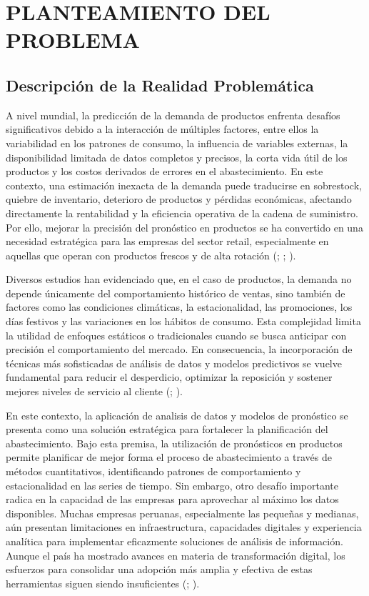 \chapter{PLANTEAMIENTO DEL PROBLEMA}
\section{Descripción de la Realidad Problemática}


A nivel mundial, la predicción de la demanda de productos enfrenta desafíos significativos debido a la interacción de múltiples factores, entre ellos la variabilidad en los patrones de consumo, la influencia de variables externas, la disponibilidad limitada de datos completos y precisos, la corta vida útil de los productos y los costos derivados de errores en el abastecimiento. En este contexto, una estimación inexacta de la demanda puede traducirse en sobrestock, quiebre de inventario, deterioro de productos y pérdidas económicas, afectando directamente la rentabilidad y la eficiencia operativa de la cadena de suministro. Por ello, mejorar la precisión del pronóstico en productos se ha convertido en una necesidad estratégica para las empresas del sector retail, especialmente en aquellas que operan con productos frescos y de alta rotación (\cite{foodbank}; \cite{FAO2011}; \cite{ElMadini2024}).

Diversos estudios han evidenciado que, en el caso de productos, la demanda no depende únicamente del comportamiento histórico de ventas, sino también de factores como las condiciones climáticas, la estacionalidad, las promociones, los días festivos y las variaciones en los hábitos de consumo. Esta complejidad limita la utilidad de enfoques estáticos o tradicionales cuando se busca anticipar con precisión el comportamiento del mercado. En consecuencia, la incorporación de técnicas más sofisticadas de análisis de datos y modelos predictivos se vuelve fundamental para reducir el desperdicio, optimizar la reposición y sostener mejores niveles de servicio al cliente (\cite{foodbank}; \cite{ElMadini2024}).

En este contexto, la aplicación de analisis de datos y modelos de pronóstico se presenta como una solución estratégica para fortalecer la planificación del abastecimiento. Bajo esta premisa, la utilización de pronósticos en productos permite planificar de mejor forma el proceso de abastecimiento a través de métodos cuantitativos, identificando patrones de comportamiento y estacionalidad en las series de tiempo. Sin embargo, otro desafío importante radica en la capacidad de las empresas para aprovechar al máximo los datos disponibles. Muchas empresas peruanas, especialmente las pequeñas y medianas, aún presentan limitaciones en infraestructura, capacidades digitales y experiencia analítica para implementar eficazmente soluciones de análisis de información. Aunque el país ha mostrado avances en materia de transformación digital, los esfuerzos para consolidar una adopción más amplia y efectiva de estas herramientas siguen siendo insuficientes (\cite{HerediaCEPAL}; \cite{CEPAL2021}).

